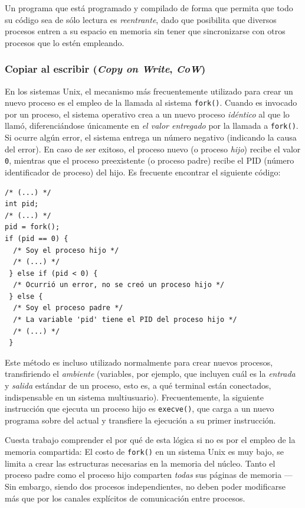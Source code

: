 \documentclass[11pt,fleqn]{book} %
\begin{document}
Un programa que está programado y compilado de forma que
permita que todo su código sea de sólo lectura es \emph{reentrante}, dado
que posibilita que diversos procesos entren a su espacio en memoria
sin tener que sincronizarse con otros procesos que lo estén
empleando.
\subsubsection{Copiar al escribir (\emph{Copy on Write}, \emph{CoW})}
\label{sec-5-4-3-1}


En los sistemas Unix, el mecanismo más frecuentemente utilizado para
crear un nuevo proceso es el empleo de la llamada al sistema
\texttt{fork()}. Cuando es invocado por un proceso, el sistema operativo crea
a un nuevo proceso \emph{idéntico} al que lo llamó, diferenciándose
únicamente en \emph{el valor entregado} por la llamada a \texttt{fork()}. Si
ocurre algún error, el sistema entrega un número negativo (indicando
la causa del error). En caso de ser exitoso, el proceso nuevo (o
proceso \emph{hijo}) recibe el valor \texttt{0}, mientras que el proceso
preexistente (o proceso padre) recibe el PID (número identificador de
proceso) del hijo. Es frecuente encontrar el siguiente código:


\begin{verbatim}
/* (...) */
int pid;
/* (...) */
pid = fork();
if (pid == 0) {
  /* Soy el proceso hijo */
  /* (...) */
 } else if (pid < 0) {
  /* Ocurrió un error, no se creó un proceso hijo */
 } else {
  /* Soy el proceso padre */
  /* La variable 'pid' tiene el PID del proceso hijo */
  /* (...) */
 }
\end{verbatim}

Este método es incluso utilizado normalmente para crear nuevos
procesos, transfiriendo el \emph{ambiente} (variables, por ejemplo, que
incluyen cuál es la \emph{entrada} y \emph{salida} estándar de un proceso, esto
es, a qué terminal están conectados, indispensable en un sistema
multiusuario). Frecuentemente, la siguiente instrucción que ejecuta un
proceso hijo es \texttt{execve()}, que carga a un nuevo programa sobre del
actual y transfiere la ejecución a su primer instrucción.

Cuesta trabajo comprender el por qué de esta lógica si no es por el
empleo de la memoria compartida: El costo de \texttt{fork()} en un sistema
Unix es muy bajo, se limita a crear las estructuras necesarias en la
memoria del núcleo. Tanto el proceso padre como el proceso hijo
comparten \emph{todas} sus páginas de memoria — Sin embargo, siendo dos
procesos independientes, no deben poder modificarse más que por los
canales explícitos de comunicación entre procesos.
\end{document}
